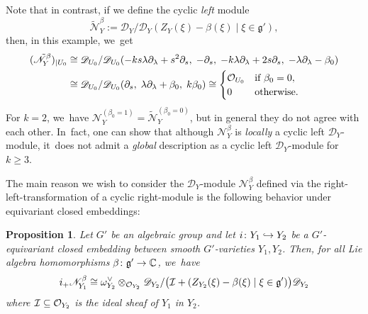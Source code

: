 \documentclass[11pt]{article}
\newcommand\hto{\mathrel{\lhook\joinrel\to}}
\newtheorem{prop}[thm]{Proposition}
\newcommand{\frg}{\mathfrak{g}}
\newcommand\restrK[2]{{(#1)_{| {#2}}}}
\begin{document}
\begin{exa}
Note that in contrast, if we define the cyclic \emph{left} module
\[
\tilde{\mathscr N}_Y^\beta := \mathscr{D}_Y/\mathscr{D}_Y(Z_Y(\xi)-\beta(\xi) \mid \xi \in \frg'),
\]
then, in this example, we~get
\begin{align*}
\restrK{\tilde{\mathscr N}_Y^\beta}{U_0} &\cong
\mathscr{D}_{U_0}/\mathscr{D}_{U_0}(
-ks \lambda \partial_\lambda + s^2 \partial_s, \;
-\partial_s, \;
-k \lambda \partial_\lambda + 2 s \partial_s, \;
-\lambda \partial_\lambda - \beta_0) \\
&\cong \mathscr{D}_{U_0}/\mathscr{D}_{U_0}(
\partial_s, \;
\lambda \partial_\lambda + \beta_0, \;
k \beta_0)
\cong
\begin{cases}
\O_{U_0} &\text{if } \beta_0 = 0, \\
0 &\text{otherwise}.
\end{cases}
\end{align*}
For $k = 2$, we~have $\mathscr N_Y^{(\beta_0=1)} = \tilde{\mathscr N}_Y^{(\beta_0=0)}$, but in general they do not agree with each other. In~fact, one can show that although $\mathscr{N}_Y^\beta$ is \emph{locally} a cyclic left $\mathscr D_Y$\nobreakdash-mod\-ule, it~does not admit a \emph{global} description as a cyclic left $\mathscr D_Y$\nobreakdash-mod\-ule for $k \geq 3$.
\end{exa}

The main reason we wish to consider the $\mathscr D_Y$\nobreakdash-mod\-ule $\mathscr N_Y^\beta$ defined via the right-left-transformation of a cyclic right\nobreakdash-mod\-ule is the following behavior under equivariant closed embeddings:

\begin{prop} \label{prop:directImageOfNbeta}
Let $G'$ be an algebraic group and let $i \colon Y_1 \hto Y_2$ be a $G'$\nobreakdash-equi\-variant closed embedding between smooth $G'$-varieties $Y_1,Y_2$.
Then, for all Lie algebra homomorphisms $\beta \colon \frg' \to \C$, we~have
\[
i_+ \mathscr N_{Y_1}^\beta \cong \omega_{Y_2}^\vee \otimes_{\O_{Y_2}} \mathscr{D}_{Y_2}/\big(\mathcal{I} + (Z_{Y_2}(\xi)-\beta(\xi) \mid \xi \in \frg')\big)\mathscr{D}_{Y_2}
\]
where $\mathcal {I} \subseteq \mathcal{O}_{Y_2}$ is the ideal sheaf of $Y_1$ in $Y_2$.
\end{prop}
\end{document}
